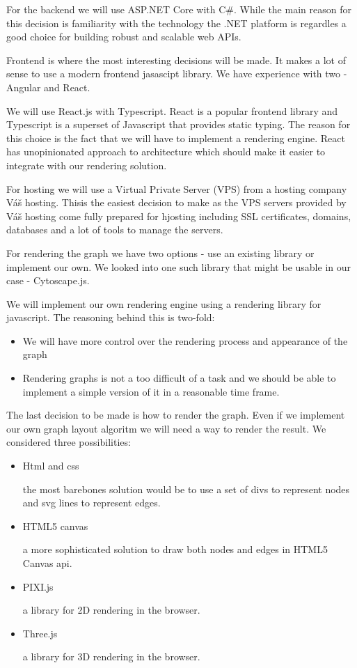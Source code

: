 For the backend we will use ASP.NET Core with C\#.
While the main reason for this decision is familiarity with the technology the .NET platform is regardles a good choice for building robust and scalable web APIs.

Frontend is where the most interesting decisions will be made. It makes a lot of sense to use a modern frontend jasascipt library.
We have experience with two - Angular and React.

We will use React.js with Typescript. React is a popular frontend library and Typescript is a superset of Javascript that provides static typing.
The reason for this choice is the fact that we will have to implement a rendering engine.
React has unopinionated approach to architecture which should make it easier to integrate with our rendering solution.

For hosting we will use a Virtual Private Server (VPS) from a hosting company Váš hosting.
Thisis the easiest decision to make as the VPS servers provided by Váš hosting come fully prepared for hjosting including
SSL certificates, domains, databases and a lot of tools to manage the servers.

For rendering the graph we have two options - use an existing library or implement our own.
We looked into one such library that might be usable in our case - Cytoscape.js.

We will implement our own rendering engine using a rendering library for javascript. The reasoning behind this is two-fold:
\begin{itemize}
    \item We will have more control over the rendering process and appearance of the graph
    \item Rendering graphs is not a too difficult of a task and we should be able to implement a simple version of it in a reasonable time frame.
\end{itemize}

The last decision to be made is how to render the graph.
Even if we implement our own graph layout algoritm we will need a way to render the result.
We considered three possibilities:
\begin{itemize}
    \item Html and css

    the most barebones solution would be to use a set of divs to represent nodes and svg lines to represent edges.
    \item HTML5 canvas

    a more sophisticated solution to draw both nodes and edges in HTML5 Canvas api.
    \item PIXI.js

    a library for 2D rendering in the browser.
    \item Three.js

    a library for 3D rendering in the browser.
\end{itemize}

